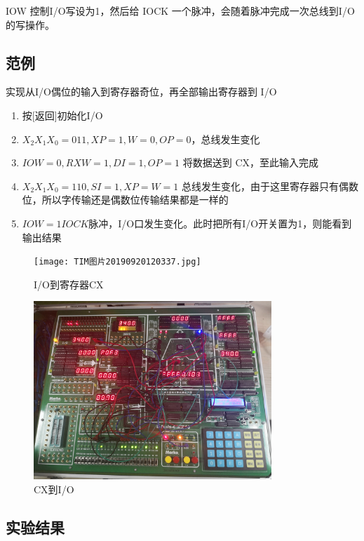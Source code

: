 \documentclass[a4paper,10pt,UTF8]{paper}
\numberwithin{equation}{section}
\numberwithin{figure}{section}
\begin{document}
IOW 控制I/O写设为1，然后给 IOCK 一个脉冲，会随着脉冲完成一次总线到I/O的写操作。

\subsection{范例}

实现从I/O偶位的输入到寄存器奇位，再全部输出寄存器到 I/O

\begin{enumerate}
    \item 按[返回]初始化I/O
    \item $X_2X_1X_0 = 011, XP=1,W=0,OP=0$，总线发生变化
    \item $IOW=0, RXW=1, DI=1, OP=1$ 将数据送到 CX，至此输入完成
    \item $X_2X_1X_0 = 110, SI = 1,XP = W = 1$ 总线发生变化，由于这里寄存器只有偶数位，所以字传输还是偶数位传输结果都是一样的
    \item $IOW=1 IOCK$脉冲，I/O口发生变化。此时把所有I/O开关置为1，则能看到输出结果
\end{enumerate}{}

\begin{figure}[h]
    \centering
    \texttt{[image: TIM图片20190920120337.jpg]}
    \caption{I/O到寄存器CX}
    \label{fig:iocx}
\end{figure}

\begin{figure}[h]
    \centering
    \includegraphics[width=0.8\textwidth]{TIM图片20190920120351.jpg}
    \caption{CX到I/O}
    \label{fig:cxio}
\end{figure}

\subsection{实验结果}
\end{document}

